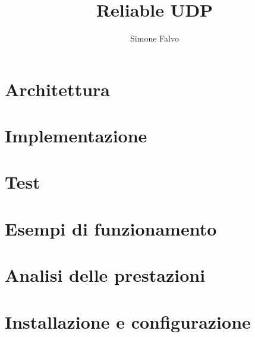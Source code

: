 \documentclass[a4paper,titlepage]{article}
\title{Reliable UDP}
\author{Simone Falvo}
\begin{document}
\maketitle



\tableofcontents
\newpage

\section{Architettura}




\section{Implementazione}





\section{Test}

\section{Esempi di funzionamento}

\section{Analisi delle prestazioni}

\section{Installazione e configurazione}
\end{document}

